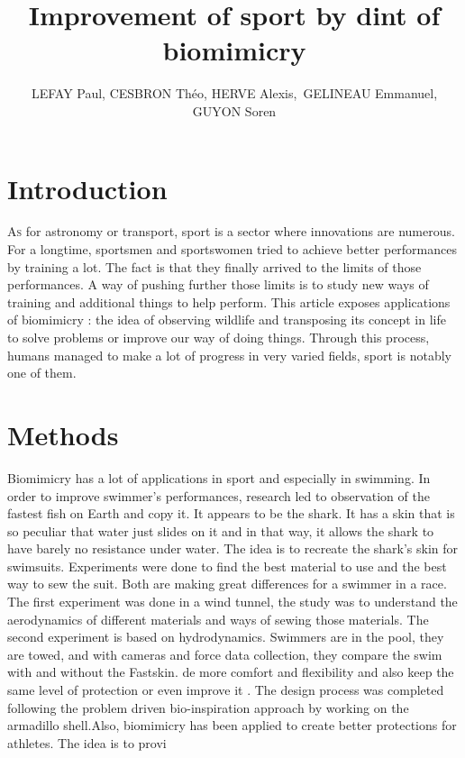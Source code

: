 \documentclass[twoside,twocolumn]{article}                          %
\title{Improvement of sport by dint of biomimicry}                  %
\author{LEFAY Paul, CESBRON Théo, HERVE Alexis,\
GELINEAU Emmanuel, GUYON Soren}                                     %
\begin{document}
\renewcommand\thesection{\Roman{section}}                           %
\renewcommand\thesubsection{\roman{subsection}}                     %

\cfoot{\thepage}                                                    %

\maketitle{}										                                    %
\newpage

\section{Introduction}
\lettrine[nindent=0em,lines=2]{A} s for astronomy or transport, sport is a sector where innovations are numerous. For a longtime, sportsmen and sportswomen tried to achieve better performances by training a lot. The fact is that they finally arrived to the limits of those performances. A way of pushing further those limits is to study new ways of training and additional things to help perform. This article exposes applications of biomimicry : the idea of observing wildlife and transposing its concept in life to solve problems or improve our way of doing things. Through this process, humans managed to make a lot of progress in very varied fields, sport is notably one of them.

\section{Methods}
Biomimicry has a lot of applications in sport and especially in swimming.
In order to improve swimmer’s performances, research led to observation of the fastest fish on Earth and copy it. It appears to be the shark. It has a skin that is so peculiar that water just slides on it and in that way, it allows the shark to have barely no resistance under water. The idea is to recreate the shark’s skin for swimsuits. Experiments were done to find the best material to use and the best way to sew the suit. Both are making great differences for a swimmer in a race. The first experiment was done in a wind tunnel, the study was to understand the aerodynamics of different materials and ways of sewing those materials. The second experiment is based on hydrodynamics. Swimmers are in the pool, they are towed, and with cameras and force data collection, they compare the swim with and without the Fastskin.
de more comfort and flexibility and also keep the same level of protection or even improve it . The design process was completed following the problem driven bio-inspiration approach by working on the armadillo shell\cite{armadillo}.Also, biomimicry has been applied to create better protections for athletes. The idea is to provi
\end{document}
